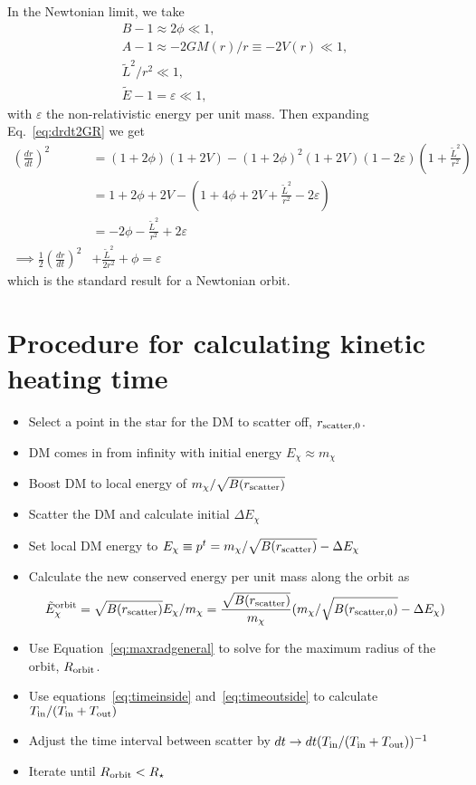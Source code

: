 In the Newtonian limit, we take 
\begin{align}
B - 1\approx2 \phi \ll 1,\\
A - 1 \approx - 2 G M(r) / r \equiv -2V(r)\ll 1,\\
\tilde L^2 /r^2 \ll 1,\\
\tilde E - 1 = \varepsilon \ll 1,
\end{align}
with $\varepsilon$ the non-relativistic energy per unit mass. Then expanding Eq.~\ref{eq:drdt2GR} we get
\begin{align}
    \left(\frac{dr}{dt}\right)^2 & = (1 + 2 \phi)(1 + 2V) - (1 + 2\phi)^2(1 + 2 V)(1 - 2 \varepsilon)\left(1 + \frac{\tilde L^2}{r^2}\right)\\
    & = 1 + 2 \phi + 2 V - \left(1 + 4 \phi + 2 V + \frac{\tilde L^2}{r^2} - 2 \varepsilon \right)\\
    & = -2 \phi - \frac{\tilde L^2}{r^2} + 2 \varepsilon\\
    \implies \frac{1}{2}\left(\frac{dr}{dt}\right)^2 & +\frac{\tilde L^2}{ 2 r^2} + \phi = \varepsilon
\end{align}
which is the standard result for a Newtonian orbit.

\section{Procedure for calculating kinetic heating time}

\begin{itemize}
    \item Select a point in the star for the DM to scatter off, $r_{\rm scatter, 0}$. 
    \item DM comes in from infinity with initial energy $E_\chi \approx m_\chi$
    \item Boost DM to local energy of $m_\chi/\sqrt{B(r_{\rm scatter})}$
    \item Scatter the DM and calculate initial $\Delta E_\chi$
    \item Set local DM energy to $E_\chi \equiv p^t = m_\chi/\sqrt{B(r_{\rm scatter})} - \Delta E_\chi$
    \item Calculate the new conserved energy per unit mass along the orbit as 
    \begin{equation}
        \tilde E_\chi^{\rm orbit} = \sqrt{B(r_{\rm scatter})}E_\chi/m_\chi = \frac{\sqrt{B(r_{\rm scatter})}}{ m_\chi} (m_\chi/\sqrt{B(r_{\rm scatter, 0})} - \Delta E_\chi)
    \end{equation}
    \item Use Equation~\ref{eq:maxradgeneral} to solve for the maximum radius of the orbit, $R_{\rm orbit}$. 
    \item Use equations~\ref{eq:timeinside} and~\ref{eq:timeoutside} to calculate $T_{\rm in} / (T_{\rm in} + T_{\rm out})$
    \item Adjust the time interval between scatter by $dt\rightarrow dt (T_{\rm in} / (T_{\rm in} + T_{\rm out}))^{-1}$
    \item Iterate until $R_{\rm orbit} < R_\star$
\end{itemize}